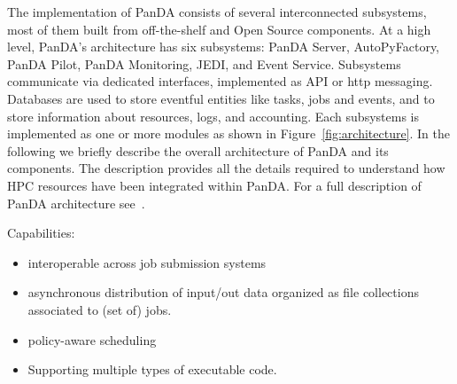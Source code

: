 The implementation of PanDA consists of several interconnected subsystems, most
of them built from off-the-shelf and Open Source components. At a high level,
PanDA's architecture has six subsystems: PanDA Server, AutoPyFactory, PanDA
Pilot, PanDA Monitoring, JEDI, and Event Service. Subsystems communicate via
dedicated interfaces, implemented as API or http messaging. Databases are used
to store eventful entities like tasks, jobs and events, and to store information
about resources, logs, and accounting. Each subsystems is implemented as one or
more modules as shown in Figure~\ref{fig:architecture}. In the following we
briefly describe the overall architecture of PanDA and its components. The
description provides all the details required to understand how HPC resources
have been integrated within PanDA. For a full description of PanDA architecture
see~\cite{wiki, papers}.

Capabilities:
\begin{itemize}
  \item interoperable across job submission systems
  \item asynchronous distribution of input/out data organized as file collections associated to (set of) jobs.
  \item policy-aware scheduling
  \item Supporting multiple types of executable code.
\end{itemize}



